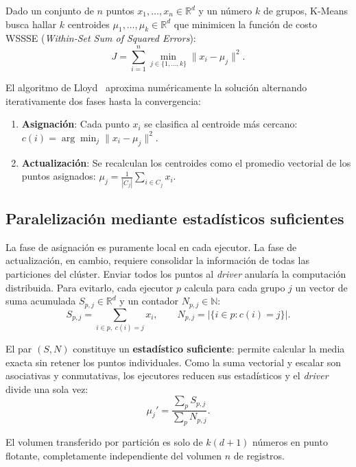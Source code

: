 \documentclass[conference,a4paper]{IEEEtran}
\begin{document}
Dado un conjunto de $n$ puntos $x_1,\ldots,x_n \in \mathbb{R}^d$ y un número $k$ de grupos, K-Means busca hallar $k$ centroides $\mu_1,\ldots,\mu_k \in \mathbb{R}^d$ que minimicen la función de costo WSSSE (\textit{Within-Set Sum of Squared Errors}):
\begin{equation}
J = \sum_{i=1}^{n} \min_{j \in \{1,\ldots,k\}} \lVert x_i - \mu_j \rVert^2 .
\label{eq:costo}
\end{equation}

El algoritmo de Lloyd~\cite{lloyd1982,macqueen1967} aproxima numéricamente la solución alternando iterativamente dos fases hasta la convergencia:
\begin{enumerate}
\item \textbf{Asignación}: Cada punto $x_i$ se clasifica al centroide más cercano: $c(i) = \arg\min_j \lVert x_i - \mu_j \rVert^2$.
\item \textbf{Actualización}: Se recalculan los centroides como el promedio vectorial de los puntos asignados: $\mu_j = \frac{1}{|C_j|} \sum_{i \in C_j} x_i$.
\end{enumerate}

\subsection{Paralelización mediante estadísticos suficientes}

La fase de asignación es puramente local en cada ejecutor. La fase de actualización, en cambio, requiere consolidar la información de todas las particiones del clúster. Enviar todos los puntos al \textit{driver} anularía la computación distribuida. Para evitarlo, cada ejecutor $p$ calcula para cada grupo $j$ un vector de suma acumulada $S_{p,j} \in \mathbb{R}^d$ y un contador $N_{p,j} \in \mathbb{N}$:
\begin{equation}
S_{p,j} = \sum_{i \in p,\; c(i)=j} x_i, \qquad N_{p,j} = \bigl|\{ i \in p : c(i)=j \}\bigr| .
\end{equation}

El par $(S, N)$ constituye un \textbf{estadístico suficiente}: permite calcular la media exacta sin retener los puntos individuales. Como la suma vectorial y escalar son asociativas y conmutativas, los ejecutores reducen sus estadísticos y el \textit{driver} divide una sola vez:
\begin{equation}
\mu_j' = \frac{\sum_p S_{p,j}}{\sum_p N_{p,j}} .
\label{eq:centroide}
\end{equation}

El volumen transferido por partición es solo de $k(d+1)$ números en punto flotante, completamente independiente del volumen $n$ de registros.
\end{document}
